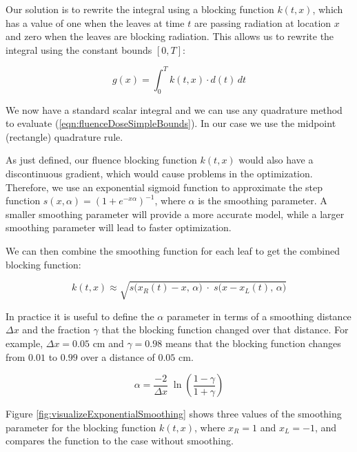 \documentclass[12pt]{article}
\begin{document}
Our solution is to rewrite the integral using a blocking function $k(t,x)$, which has a value of one when the leaves at time $t$ are passing radiation at location $x$ and zero when the leaves are blocking radiation. This allows us to rewrite the integral using the constant bounds $[0, T]$:

\begin{equation}
  g(x) = \int_0^T \! k(t, x) \cdot d(t) \, dt
  \label{eqn:fluenceDoseSimpleBounds}
\end{equation}

We now have a standard scalar integral and we can use any quadrature method to evaluate (\ref{eqn:fluenceDoseSimpleBounds}).
In our case we use the midpoint (rectangle) quadrature rule.

As just defined, our fluence blocking function $k(t,x)$
would also have a discontinuous gradient, which would cause problems in the optimization.
Therefore, we use an exponential sigmoid function to approximate the step function
$s(x, \alpha) = (1 + e^{-x \alpha})^{-1}$, where $\alpha$ is the smoothing parameter. A smaller smoothing parameter will provide a more accurate model, while a larger smoothing parameter will lead to faster optimization.

We can then combine the smoothing function for each leaf to get the combined blocking function:

\begin{equation}
  k(t, x) \approx \sqrt{s\big(x_R(t) -x, \, \alpha\big) \; \cdot \; s\big(x -x_L(t), \, \alpha\big)}
  \label{eqn:blockingFunction}
\end{equation}


In practice it is useful to define the $\alpha$ parameter in terms of 
a smoothing distance $\Delta x$ and 
the fraction $\gamma$ that the blocking function changed over that distance.
For example, $\Delta x = 0.05$ cm and $\gamma = 0.98$ means that 
the blocking function changes from $0.01$ to $0.99$ over a distance of $0.05$ cm.


\begin{equation}
  \alpha = \frac{-2}{\Delta x} \; \ln \! \left( \frac{1 - \gamma}{1 + \gamma} \right)
  \label{eqn:SmoothingDistanceParameter}
\end{equation}

Figure \ref{fig:visualizeExponentialSmoothing} shows three values of the smoothing parameter for the blocking function $k(t, x)$, where $x_R = 1$ and $x_L = -1$, and compares the function to the case without smoothing.
\end{document}
